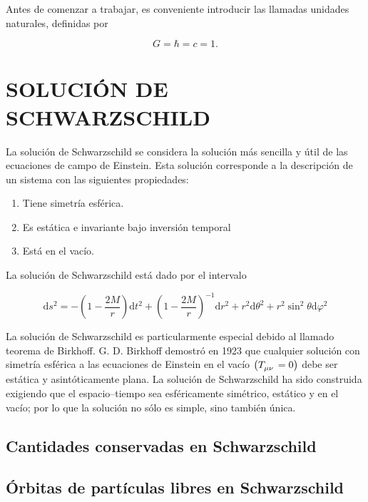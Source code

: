 \documentclass[11pt]{article}
\begin{document}
Antes de comenzar a trabajar, es conveniente introducir las llamadas unidades naturales, definidas por

\begin{equation}
G = \hbar = c = 1.
\label{ec:unidades naturales}
\end{equation}


\section{SOLUCIÓN DE SCHWARZSCHILD}

La solución de Schwarzschild se considera la solución más sencilla y útil de las ecuaciones de campo de Einstein. Esta solución corresponde a la descripción de un sistema con las siguientes propiedades: \cite{Luminet_1979} \cite{Amarilla_2012} \cite{Amarilla_2018}

\begin{enumerate}
\item Tiene simetría esférica.
\item Es estática e invariante bajo inversión temporal
\item Está en el vacío. 
\end{enumerate}

La solución de Schwarzschild está dado por el intervalo

\begin{equation}
\text{d}s^{2} = -\left( 1 - \dfrac{2M}{r} \right)\text{d}t^{2} + \left( 1 - \dfrac{2M}{r} \right)^{-1}\text{d}r^{2}
+ r^{2}\text{d}\theta^{2} + r^{2}\sin^{2}\theta\text{d}\varphi^{2}
\label{ec:intervalo Schwarzschild}
\end{equation}

La solución de Schwarzschild es particularmente especial debido al llamado teorema de Birkhoff. G. D. Birkhoff demostró en 1923 que cualquier solución con simetría esférica a las ecuaciones de Einstein en el vacío $ \left( \tensor{T}{_\mu_\nu} = 0 \right) $ debe ser estática y asintóticamente plana. La solución de Schwarzschild ha sido construida exigiendo que el espacio–tiempo sea esféricamente simétrico, estático y en el vacío; por lo que la solución no sólo es simple, sino también única.

\subsection{Cantidades conservadas en Schwarzschild}

\subsection{Órbitas de partículas libres en Schwarzschild}
\end{document}
